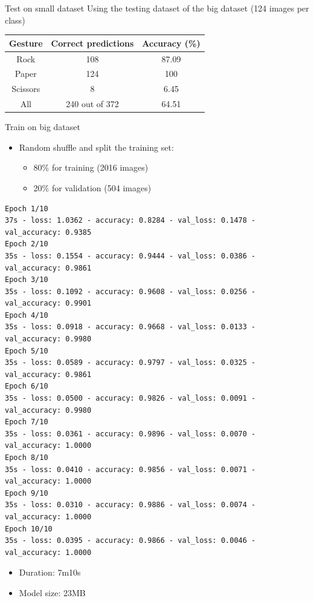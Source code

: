 \begin{frame}{Test on small dataset}
Using the testing dataset of the big dataset (124 images per class)
  \begin{table}
	\begin{tabular}{|c|c|c|}
	  \hline
		\textbf{Gesture} & \textbf{Correct predictions} & \textbf{Accuracy (\%)} \\
	  \hline
		Rock & 108 & 87.09 \\
	  \hline
		Paper & 124 & 100 \\
	  \hline
		Scissors & 8 & 6.45 \\
	  \hline
	  \hline
		All & 240 out of 372 & 64.51 \\
	  \hline
	\end{tabular}
  \end{table}
\end{frame}

\begin{frame}[fragile]{Train on big dataset}
  \begin{itemize}
	\item Random shuffle and split the training set:
	\begin{itemize}
	  \item 80\% for training (2016 images)
	  \item 20\% for validation (504 images)
	\end{itemize}
  \end{itemize}
  \lstset{basicstyle=\tiny, numbers=left}
  \begin{lstlisting}
Epoch 1/10
37s - loss: 1.0362 - accuracy: 0.8284 - val_loss: 0.1478 - val_accuracy: 0.9385
Epoch 2/10
35s - loss: 0.1554 - accuracy: 0.9444 - val_loss: 0.0386 - val_accuracy: 0.9861
Epoch 3/10
35s - loss: 0.1092 - accuracy: 0.9608 - val_loss: 0.0256 - val_accuracy: 0.9901
Epoch 4/10
35s - loss: 0.0918 - accuracy: 0.9668 - val_loss: 0.0133 - val_accuracy: 0.9980
Epoch 5/10
35s - loss: 0.0589 - accuracy: 0.9797 - val_loss: 0.0325 - val_accuracy: 0.9861
Epoch 6/10
35s - loss: 0.0500 - accuracy: 0.9826 - val_loss: 0.0091 - val_accuracy: 0.9980
Epoch 7/10
35s - loss: 0.0361 - accuracy: 0.9896 - val_loss: 0.0070 - val_accuracy: 1.0000
Epoch 8/10
35s - loss: 0.0410 - accuracy: 0.9856 - val_loss: 0.0071 - val_accuracy: 1.0000
Epoch 9/10
35s - loss: 0.0310 - accuracy: 0.9886 - val_loss: 0.0074 - val_accuracy: 1.0000
Epoch 10/10
35s - loss: 0.0395 - accuracy: 0.9866 - val_loss: 0.0046 - val_accuracy: 1.0000
  \end{lstlisting}
  \begin{itemize}
	\item Duration: 7m10s
	\item Model size: 23MB
  \end{itemize}
\end{frame}

